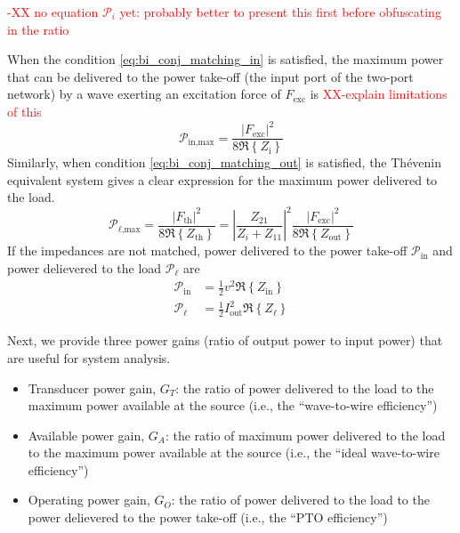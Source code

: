 \documentclass[lettersize,journal]{IEEEtran}
\newcommand{\rc}[1]{\textcolor{red}{#1}}
\begin{document}
\rc{-XX no equation $\mathcal{P}_i$ yet: probably better to present this first before obfuscating in the ratio}

When the condition \eqref{eq:bi_conj_matching_in} is satisfied, the maximum power that can be delivered to the power take-off (the input port of the two-port network) by a wave exerting an excitation force of $F_{\textrm{exc}}$ \cite{Falnes:2002aa} is \rc{XX-explain limitations of this}
\begin{equation}
        \mathcal{P}_{\textrm{in,max}} = \frac{| F_{\textrm{exc}} |^2 }{ 8 \Re \left\{ Z_{\textrm{i}} \right\} }
\end{equation}
Similarly, when condition \eqref{eq:bi_conj_matching_out} is satisfied, the Th\'{e}venin equivalent system gives a clear expression for the maximum power delivered to the load.
\begin{equation}
        \mathcal{P}_{\ell\textrm{,max}} = \frac{| F_{\textrm{th}} |^2 }{ 8 \Re \left\{ Z_{\textrm{th}} \right\} }
        = \left| \frac{ Z_{21} }{ Z_i + Z_{11} } \right| ^2 \frac{ | F_{\textrm{exc}} |^2 }{ 8 \Re \left\{ Z_{\textrm{out}} \right\} } \label{eq:max_power_delivered_thevenin}
\end{equation}
If the impedances are not matched, power delivered to the power take-off $\mathcal{P}_{\textrm{in}}$ and power delievered to the load $\mathcal{P}_\ell$ are
\begin{subequations}
        \begin{align}
                \mathcal{P}_{\textrm{in}} &= \frac{1}{2} v^2 \Re \left\{ Z_{\textrm{in}} \right\}\\
                \mathcal{P}_\ell &= \frac{1}{2} I_{\textrm{out}}^2 \Re \left\{ Z_{\ell} \right\}
        \end{align}
\end{subequations}

Next, we provide three power gains (ratio of output power to input power) that are useful for system analysis. 

\begin{itemize}
        \item Transducer power gain, $G_T$: the ratio of power delivered to the load to the maximum power available at the source (i.e., the ``wave-to-wire efficiency'')
        \item Available power gain, $G_A$: the ratio of maximum power delivered to the load to the maximum power available at the source (i.e., the ``ideal wave-to-wire efficiency'')
        \item Operating power gain, $G_O$: the ratio of power delivered to the load to the power delievered to the power take-off (i.e., the ``PTO efficiency'')
\end{itemize}
\end{document}
